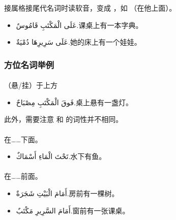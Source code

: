 \begin{attention}
     接属格接尾代名词时读软音，变成  ，如  （在他上面）。
\end{attention}

\begin{itemize}
    \item \ac{عَلَى الْمَكْتَبِ قَامُوسٌ.}{课桌上有一本字典。}
    \item \ac{عَلَى سَرِيرِهَا دُمْيَةٌ.}{她的床上有一个娃娃。}
\end{itemize}


\subsubsection{方位名词举例}

\paragraph{} （悬/挂）于上方

\begin{itemize}
    \item \ac{فَوقَ الْمَكْتَبِ مِصْبَاحٌ.}{桌上悬有一盏灯。}
\end{itemize}

\begin{note}
    \begin{center}
        
        
    \end{center}
\end{note}

\begin{attention}
    此外，需要注意  和  的词性并不相同。
\end{attention}
    
\paragraph{} 在……下面。
\begin{itemize}
    \item \ac{تَحْتَ الْمَاءِ أَسْمَاكٌ.}{水下有鱼。}
\end{itemize}

\paragraph{} 在……前面。
\begin{itemize}
    \item \ac{أَمَامَ الْبَيْتِ شَجَرَةٌ.}{房前有一棵树。}
    \item \ac{أَمَامَ السَّرِيرِ مَكْتَبٌ.}{窗前有一张课桌。}
\end{itemize}


